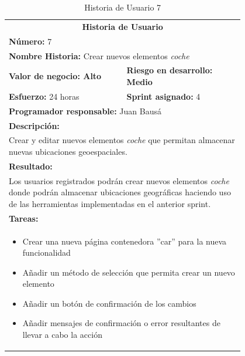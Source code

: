 	\begin{table}[H]
	  \centering 
	 	\begin{tabular}{p{0.4\linewidth}p{0.4\linewidth}}
	    \toprule
	    \multicolumn{2}{c}{\cellcolor{black!30}\textbf{Historia de Usuario}} 													\\
		\multicolumn{2}{l}{\cellcolor{gray!25}\textbf{Número: }7}																\\
		\multicolumn{2}{l}{\textbf{Nombre Historia: } Crear nuevos elementos \textit{coche}}				\\
		\cellcolor{gray!25}\textbf{Valor de negocio: Alto}	&	\cellcolor{gray!25}\textbf{Riesgo en desarrollo: Medio}		\\
		\textbf{Esfuerzo:} 24 horas				&	\textbf{Sprint asignado: }4												\\
		\multicolumn{2}{l}{\cellcolor{gray!25}\textbf{Programador responsable: }Juan Bausá}									\\
		\multicolumn{2}{l}{\textbf{Descripción:}}                                                     						\\
		\multicolumn{2}{l}{\parbox{15cm}{Crear y editar nuevos elementos \textit{coche} que permitan almacenar nuevas ubicaciones geoespaciales.}}				\\
		\multicolumn{2}{l}{\cellcolor{gray!25}\textbf{Resultado:}}																\\		
		\multicolumn{2}{l}{\parbox{15cm}{Los usuarios registrados podrán crear nuevos elementos \textit{coche} donde podrán almacenar ubicaciones geográficas haciendo uso de las herramientas implementadas en el anterior sprint.}}																	\\
		\multicolumn{2}{l}{\textbf{Tareas:}}																					\\
		\multicolumn{2}{l}{
			\begin{minipage}{12cm}
	    		\vskip 4pt
	    		\begin{itemize}
	    			\item Crear una nueva página contenedora ''car'' para la nueva funcionalidad
	    			\item Añadir un método de selección que permita crear un nuevo elemento
	    			\item Añadir un botón de confirmación de los cambios
	    			\item Añadir mensajes de confirmación o error resultantes de llevar a cabo la acción
				\end{itemize}
			  	\vskip 4pt
		 	\end{minipage}
		} \\																				
	    \hline
	  \end{tabular}
	  \caption{Historia de Usuario 7}
	\end{table}
	

